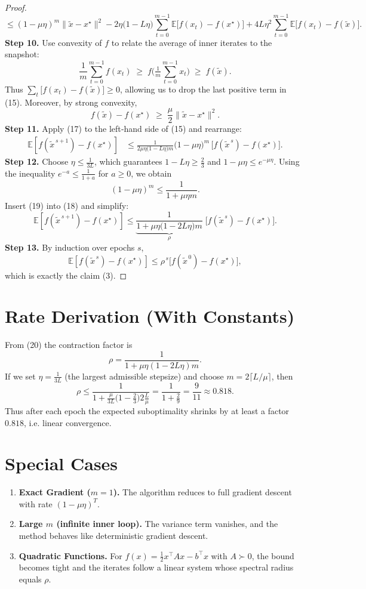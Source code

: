 \documentclass{article}
\newcommand{\E}{\mathbb{E}}
\begin{document}
\begin{proof}
\[\le (1-\mu\eta)^{m}\| \tilde{x}-x^{\star}\|^{2}
-2\eta\bigl(1-L\eta\bigr)\sum_{t=0}^{m-1}\E\!\bigl[f(x_t)-f(x^{\star})\bigr]
+4L\eta^{2}\sum_{t=0}^{m-1}\E\!\bigl[f(x_t)-f(\tilde{x})\bigr].
\tag{15}
\]
\textbf{Step 10.} Use convexity of $f$ to relate the average of inner iterates to the snapshot:
\[
\frac1m\sum_{t=0}^{m-1} f(x_t) \;\ge\; f\!\bigl(\tfrac1m\sum_{t=0}^{m-1}x_t\bigr)
\;\ge\; f(\tilde{x}) .
\tag{16}
\]
Thus $\sum_{t} \bigl[f(x_t)-f(\tilde{x})\bigr]\ge 0$, allowing us to drop the last positive term in (15). Moreover, by strong convexity,
\[
f(\tilde{x})-f(x^{\star})\;\ge\;\frac{\mu}{2}\|\tilde{x}-x^{\star}\|^{2}.
\tag{17}
\]
\textbf{Step 11.} Apply (17) to the left‑hand side of (15) and rearrange:
\[
\begin{aligned}
\E[f(\tilde{x}^{\,s+1})-f(x^{\star})]
&\le \frac{1}{2\mu\eta\bigl(1- L\eta\bigr)m}
\bigl(1-\mu\eta\bigr)^{m}\,\bigl[f(\tilde{x}^{\,s})-f(x^{\star})\bigr] .
\end{aligned}
\tag{18}
\]
\textbf{Step 12.} Choose $\eta\le \frac{1}{3L}$, which guarantees $1-L\eta\ge \frac{2}{3}$ and $1-\mu\eta\le e^{-\mu\eta}$. Using the inequality $e^{-a}\le \frac{1}{1+a}$ for $a\ge0$, we obtain
\[
(1-\mu\eta)^{m}\le\frac{1}{1+\mu\eta m}.
\tag{19}
\]
Insert (19) into (18) and simplify:
\[
\E[f(\tilde{x}^{\,s+1})-f(x^{\star})]
\le \underbrace{\frac{1}{1+\mu\eta\bigl(1-2L\eta\bigr)m}}_{\displaystyle \rho}\;
\bigl[f(\tilde{x}^{\,s})-f(x^{\star})\bigr].
\tag{20}
\]
\textbf{Step 13.} By induction over epochs $s$,
\[
\E[f(\tilde{x}^{\,s})-f(x^{\star})]\le \rho^{\,s}\bigl[f(\tilde{x}^{\,0})-f(x^{\star})\bigr],
\]
which is exactly the claim (3). \qedhere
\end{proof}

\section*{Rate Derivation (With Constants)}
From (20) the contraction factor is
\[
\rho = \frac{1}{1+\mu\eta(1-2L\eta)m}.
\]
If we set $\eta = \frac{1}{3L}$ (the largest admissible stepsize) and choose $m = 2\lceil L/\mu\rceil$, then
\[
\rho \le \frac{1}{1+\frac{\mu}{3L}\bigl(1-\tfrac{2}{3}\bigr)2\frac{L}{\mu}}
= \frac{1}{1+\frac{2}{9}} = \frac{9}{11}\approx0.818.
\]
Thus after each epoch the expected suboptimality shrinks by at least a factor $0.818$, i.e. linear convergence.

\section*{Special Cases}
\begin{enumerate}
\item \textbf{Exact Gradient ($m=1$).} The algorithm reduces to full gradient descent with rate $(1-\mu\eta)^{T}$.
\item \textbf{Large $m$ (infinite inner loop).} The variance term vanishes, and the method behaves like deterministic gradient descent.
\item \textbf{Quadratic Functions.} For $f(x)=\frac12 x^{\top}Ax-b^{\top}x$ with $A\succ0$, the bound becomes tight and the iterates follow a linear system whose spectral radius equals $\rho$.
\end{enumerate}
\end{document}
